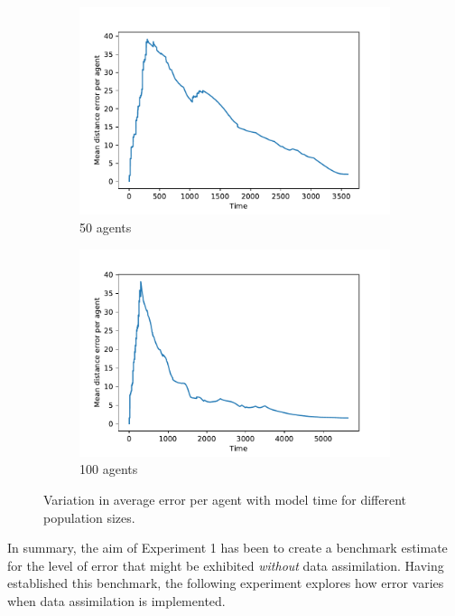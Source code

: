 \documentclass{article}
\begin{document}
\begin{figure}[ht]
	\begin{subfigure}[b]{0.45\textwidth}
		\centering
		\includegraphics[width=\textwidth]{figures/baseline/baseline_errors_50.pdf}
		\caption{50 agents}\label{fig:benchmark_gcs:50}
	\end{subfigure}
	\hfill
	\begin{subfigure}[b]{0.45\textwidth}
		\centering
		\includegraphics[width=\textwidth]{figures/baseline/baseline_errors_100.pdf}
		\caption{100 agents}\label{fig:benchmark_gcs:100}
	\end{subfigure}
	\caption{Variation in average error per agent with model time for different
		population sizes.}\label{fig:benchmark_gcs}
\end{figure}

In summary, the aim of Experiment 1 has been to create a benchmark estimate for the level of error that might be exhibited \textit{without} data assimilation. Having established this benchmark, the
following experiment explores how error varies when data assimilation is implemented.
\end{document}

